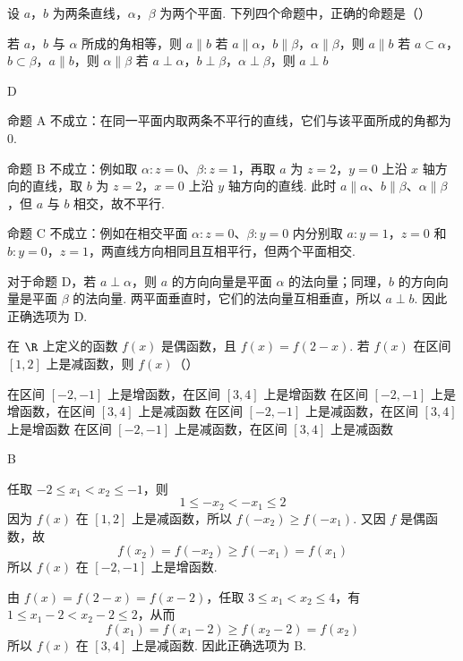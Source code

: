 \begin{problem}
设 \(a\)，\(b\) 为两条直线，\(\alpha\)，\(\beta\) 为两个平面. 下列四个命题中，正确的命题是（\quad）

\choices
    {若 \(a\)，\(b\) 与 \(\alpha\) 所成的角相等，则 \(a \parallel b\)}
    {若 \(a \parallel \alpha\)，\(b \parallel \beta\)，\(\alpha \parallel \beta\)，则 \(a \parallel b\)}
    {若 \(a \subset \alpha\)，\(b \subset \beta\)，\(a \parallel b\)，则 \(\alpha \parallel \beta\)}
    {若 \(a \perp \alpha\)，\(b \perp \beta\)，\(\alpha \perp \beta\)，则 \(a \perp b\)}
\end{problem}

\begin{answer}
D
\end{answer}

\begin{solution}
命题 A 不成立：在同一平面内取两条不平行的直线，它们与该平面所成的角都为 \(0\).

命题 B 不成立：例如取 \(\alpha:z=0\)、\(\beta:z=1\)，再取 \(a\) 为 \(z=2\)，\(y=0\) 上沿 \(x\) 轴方向的直线，取 \(b\) 为 \(z=2\)，\(x=0\) 上沿 \(y\) 轴方向的直线. 此时 \(a\parallel\alpha\)、\(b\parallel\beta\)、\(\alpha\parallel\beta\)，但 \(a\) 与 \(b\) 相交，故不平行.

命题 C 不成立：例如在相交平面 \(\alpha:z=0\)、\(\beta:y=0\) 内分别取 \(a\colon y=1\)，\(z=0\) 和 \(b\colon y=0\)，\(z=1\)，两直线方向相同且互相平行，但两个平面相交.

对于命题 D，若 \(a\perp\alpha\)，则 \(a\) 的方向向量是平面 \(\alpha\) 的法向量；同理，\(b\) 的方向向量是平面 \(\beta\) 的法向量. 两平面垂直时，它们的法向量互相垂直，所以 \(a\perp b\). 因此正确选项为 D.
\end{solution}

\begin{problem}
在 \(\R\) 上定义的函数 \(f(x)\) 是偶函数，且 \(f(x) = f(2 - x)\). 若 \(f(x)\) 在区间 \([1, 2]\) 上是减函数，则 \(f(x)\)（\quad）

\choices
    {在区间 \([-2, -1]\) 上是增函数，在区间 \([3, 4]\) 上是增函数}
    {在区间 \([-2, -1]\) 上是增函数，在区间 \([3, 4]\) 上是减函数}
    {在区间 \([-2, -1]\) 上是减函数，在区间 \([3, 4]\) 上是增函数}
    {在区间 \([-2, -1]\) 上是减函数，在区间 \([3, 4]\) 上是减函数}
\end{problem}

\begin{answer}
B
\end{answer}

\begin{solution}
任取 \(-2\leqslant x_1<x_2\leqslant-1\)，则
\[
1\leqslant-x_2<-x_1\leqslant2
\]
因为 \(f(x)\) 在 \([1,2]\) 上是减函数，所以 \(f(-x_2)\geqslant f(-x_1)\). 又因 \(f\) 是偶函数，故
\[
f(x_2)=f(-x_2)\geqslant f(-x_1)=f(x_1)
\]
所以 \(f(x)\) 在 \([-2,-1]\) 上是增函数.

由 \(f(x)=f(2-x)=f(x-2)\)，任取 \(3\leqslant x_1<x_2\leqslant4\)，有 \(1\leqslant x_1-2<x_2-2\leqslant2\)，从而
\[
f(x_1)=f(x_1-2)\geqslant f(x_2-2)=f(x_2)
\]
所以 \(f(x)\) 在 \([3,4]\) 上是减函数. 因此正确选项为 B.
\end{solution}

